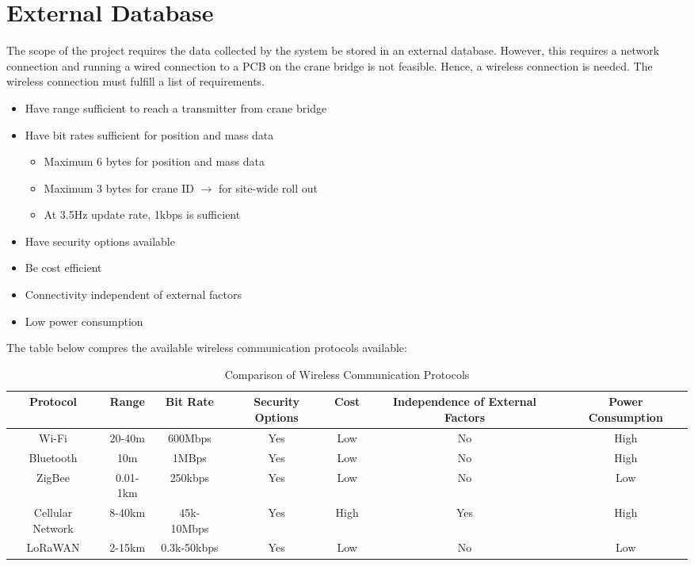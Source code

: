 \documentclass[12pt, a4paper]{article}
\begin{document}
\section{External Database}
The scope of the project requires the data collected by the system be stored in an external database. However, this requires a network connection
and running a wired connection to a PCB on the crane bridge is not feasible. Hence, a wireless connection is needed. The wireless connection must fulfill 
a list of requirements.
\begin{itemize}
    \item Have range sufficient to reach a transmitter from crane bridge
    \item Have bit rates sufficient for position and mass data
    \begin{itemize}
        \item Maximum 6 bytes for position and mass data
        \item Maximum 3 bytes for crane ID $\rightarrow$ for site-wide roll out
        \item At 3.5Hz update rate, 1kbps is sufficient
    \end{itemize}
    \item Have security options available
    \item Be cost efficient
    \item Connectivity independent of external factors
    \item Low power consumption
\end{itemize}
The table below compres the available wireless communication protocols available:
\begin{center}
    \begin{table}[H]
        \begin{adjustbox}{width=1.25\textwidth, center=\textwidth}
            \small
            \begin{tabular}{||c c c c c c c||}
                \hline
                Protocol & Range & Bit Rate & Security Options & Cost & Independence of External Factors & Power Consumption \\
                \hline
                Wi-Fi & 20-40m & 600Mbps & Yes & Low & No & High \\
                \hline
                Bluetooth & 10m & 1MBps & Yes & Low & No & High \\
                \hline
                ZigBee & 0.01-1km & 250kbps & Yes & Low & No & Low \\
                \hline
                Cellular Network & 8-40km & 45k-10Mbps & Yes & High & Yes & High \\
                \hline
                LoRaWAN & 2-15km & 0.3k-50kbps & Yes & Low & No & Low \\
                \hline
            \end{tabular}
        \end{adjustbox}
        \caption{Comparison of Wireless Communication Protocols}
        \label{tab:wireless_comp}
    \end{table}
\end{center}
\end{document}
